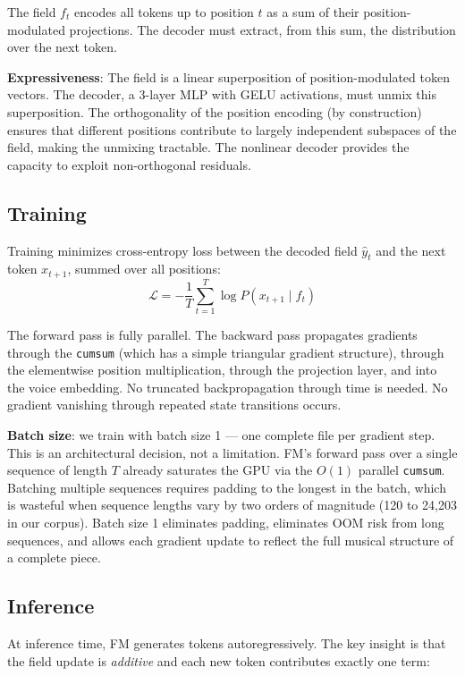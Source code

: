 \documentclass[11pt]{article}
\begin{document}
The field $f_t$ encodes all tokens up to position $t$ as a sum of their position-modulated projections. The decoder must extract, from this sum, the distribution over the next token.

\textbf{Expressiveness}: The field is a linear superposition of position-modulated token vectors. The decoder, a 3-layer MLP with GELU activations, must unmix this superposition. The orthogonality of the position encoding (by construction) ensures that different positions contribute to largely independent subspaces of the field, making the unmixing tractable. The nonlinear decoder provides the capacity to exploit non-orthogonal residuals.

\subsection{Training}

Training minimizes cross-entropy loss between the decoded field $\hat{y}_t$ and the next token $x_{t+1}$, summed over all positions:
\begin{equation}
\mathcal{L} = -\frac{1}{T} \sum_{t=1}^{T} \log P(x_{t+1} \mid f_t)
\end{equation}

The forward pass is fully parallel. The backward pass propagates gradients through the \texttt{cumsum} (which has a simple triangular gradient structure), through the elementwise position multiplication, through the projection layer, and into the voice embedding. No truncated backpropagation through time is needed. No gradient vanishing through repeated state transitions occurs.

\textbf{Batch size}: we train with batch size 1 — one complete file per gradient step. This is an architectural decision, not a limitation. FM's forward pass over a single sequence of length $T$ already saturates the GPU via the $O(1)$ parallel \texttt{cumsum}. Batching multiple sequences requires padding to the longest in the batch, which is wasteful when sequence lengths vary by two orders of magnitude (120 to 24,203 in our corpus). Batch size 1 eliminates padding, eliminates OOM risk from long sequences, and allows each gradient update to reflect the full musical structure of a complete piece.

\subsection{Inference}

At inference time, FM generates tokens autoregressively. The key insight is that the field update is \textit{additive} and each new token contributes exactly one term:
\end{document}
